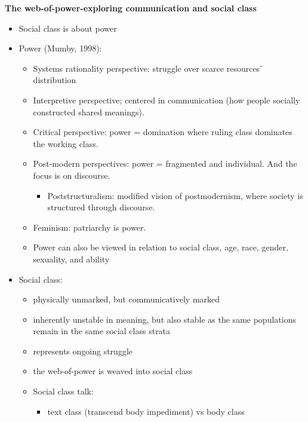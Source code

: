 \documentclass[
]{book}
\providecommand{\tightlist}{%
  \setlength{\itemsep}{0pt}\setlength{\parskip}{0pt}}
\begin{document}
\textbf{The web-of-power-exploring communication and social class}

\begin{itemize}
\item
  Social class is about power
\item
  Power (Mumby, 1998):

  \begin{itemize}
  \item
    Systems rationality perspective: struggle over scarce resources' distribution
  \item
    Interpretive perspective; centered in communication (how people socially constructed shared meanings).
  \item
    Critical perspective: power = domination where ruling class dominates the working class.
  \item
    Post-modern perspectives: power = fragmented and individual. And the focus is on discourse.

    \begin{itemize}
    \tightlist
    \item
      Poststructuralism: modified vision of postmodernism, where society is structured through discourse.
    \end{itemize}
  \item
    Feminism: patriarchy is power.
  \item
    Power can also be viewed in relation to social class, age, race, gender, sexuality, and ability
  \end{itemize}
\item
  Social class:

  \begin{itemize}
  \item
    physically unmarked, but communicatively marked
  \item
    inherently unstable in meaning, but also stable as the same populations remain in the same social class strata
  \item
    represents ongoing struggle
  \item
    the web-of-power is weaved into social class
  \item
    Social class talk:

    \begin{itemize}
    \tightlist
    \item
      text class (transcend body impediment) vs body class
    \end{itemize}
  \end{itemize}
\end{itemize}
\end{document}
